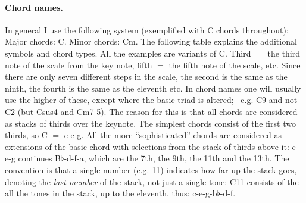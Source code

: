 \paragraph*{Chord names.} In general I use the following system
(exemplified with C chords throughout): Major chords: C. Minor chords:
Cm. The following table explains the additional symbols and chord
types. All the examples are variants of C. Third $=$ the third note of
the scale from the key note, fifth $=$ the fifth note of the scale,
etc. Since there are only seven different steps in the scale, the
second is the same as the ninth, the fourth is the same as the
eleventh etc. In chord names one will usually use the higher of these,
except where the basic triad is altered;~ e.g. C9 and not C2 (but
Csus4 and Cm7-5). The reason for this is that all chords are considered as stacks of thirds over the keynote. The simplest chords consist of the first two thirds, so C $=$ c-e-g. All the more ``{}sophisticated''{}
chords are considered as extensions of the basic chord with selections
from the stack of thirds above it: c-e-g continues B$\flat$-d-f-a,
which are the 7th, the 9th, the 11th and the 13th. The convention is
that a single number (e.g. 11) indicates how far up the stack goes,
denoting the \emph{last member} of the
stack, not just a single tone: C11 consists of the all
the tones in the stack, up to the eleventh, thus: c-e-g-b$\flat$-d-f.


\newcommand{\chordexpl}[3]{\vspace{1ex}\begin{center}{
    \setbox0\hbox{\Huge #1~}%
    \count0=\ht0                   %
    \count1=\baselineskip          %
    \divide\count0 by \count1      %
    \dimen1 = \count0\baselineskip %
    \advance\count0 by 1\relax     %
    \dimen0=\wd0                   %
    \global\hangindent\dimen0      %
    \global\hangafter+0            %
    \hskip-\dimen0\setbox0\hbox to\dimen0{\raise-\dimen1\box0\hss}%
    \dp0=0in\ht0=0in\box0}%
    \textit{#2}\\#3\par\nobreak%
\end{center}
}

